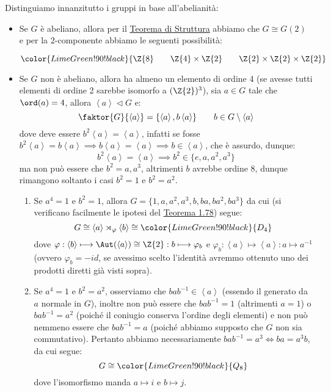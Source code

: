 \documentclass[11pt]{scrartcl}
\begin{document}
\begin{example}
    Distinguiamo innanzitutto i gruppi in base all'abelianità:
    \begin{itemize}
        \item Se $G$ è abeliano, allora per il \hyperref[t:struttura]{Teorema di Struttura} abbiamo che $G \cong G(2)$ e per la $2$-componente abbiamo le seguenti possibilità:
            \begin{center}
                $\color{LimeGreen!90!black}{\Z{8} \qquad \Z{4} \times \Z{2} \qquad \Z{2} \times \Z{2} \times \Z{2}}$
            \end{center}
        \item Se $G$ non è abeliano, allora ha almeno un elemento di ordine 4 (se avesse tutti elementi di ordine 2 sarebbe isomorfo a $(\Z{2})^3$), sia $a \in G$ tale che 
            $\ord(a) = 4$, allora $\left<a\right> \triangleleft G$ e:
                \[ \faktor{G}{\left<a\right>} = \{\left<a\right>, b\left<a\right>\} \qquad b \in G\setminus{\left<a\right>}
                    \]
            dove deve essere $b^2\left<a\right> = \left<a\right>$, infatti se fosse $b^2\left<a\right> = b\left<a\right> \implies b\left<a\right> = \left<a\right> \implies b \in \left<a\right>$, che è assurdo, dunque:
                \[ b^2\left<a\right> = \left<a\right> \implies b^2 \in \{e,a,a^2,a^3\}
                    \]
            ma non può essere che $b^2 = a,a^3$, altrimenti $b$ avrebbe ordine 8, dunque rimangono soltanto i casi $b^2 = 1$ e $b^2 = a^2$.
            \begin{enumerate}[(1)]
                \item Se $a^4 = 1$ e $b^2 = 1$, allora $G = \{1,a,a^2,a^3,b,ba,ba^2,ba^3\}$ da cui (si verificano facilmente le ipotesi del \hyperref[t:1.78]{Teorema 1.78}) segue:
                      \[ G \cong \left<a\right> \rtimes_{\varphi} \left<b\right> \cong \color{LimeGreen!90!black}{D_4}
                    \]
                    dove $\varphi : \left<b\right> \longmapsto \Aut(\left<a\right>) \cong \Z{2} : b \longmapsto \varphi_b$ e $\varphi_b : \left<a\right> \longmapsto \left<a\right> : a \longmapsto a^{-1}$ 
                    (ovvero $\varphi_b = -id$, se avessimo scelto l'identità avremmo ottenuto uno dei prodotti diretti già visti sopra).
                \item Se $a^4 = 1$ e $b^2 = a^2$, osserviamo che $bab^{-1} \in \left<a\right>$ (essendo il generato da $a$ normale in $G$), inoltre non può essere che $bab^{-1} = 1$ (altrimenti $a = 1$) o $bab^{-1} = a^2$ (poiché il coniugio conserva l'ordine degli elementi) e non 
                    può nemmeno essere che $bab^{-1} = a$ (poiché abbiamo supposto che $G$ non sia commutativo). Pertanto abbiamo necessariamente $bab^{-1} = a^3 \iff ba = a^3b$, da cui segue:
                        \[ G \cong \color{LimeGreen!90!black}{Q_8}
                            \]
                    dove l'isomorfismo manda $a \longmapsto i$ e $b \longmapsto j$.
            \end{enumerate}
    \end{itemize}
\end{example}
\end{document}
